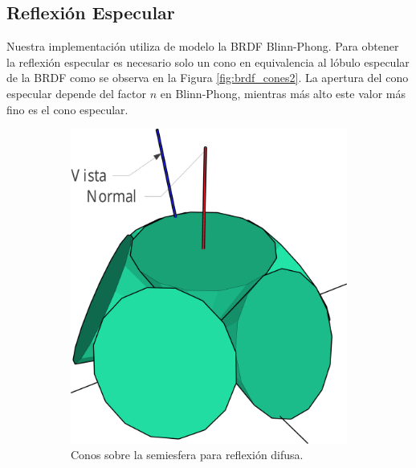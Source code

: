 \subsection{Reflexión Especular}
Nuestra implementación utiliza de modelo la \ac{BRDF} Blinn-Phong. Para obtener la reflexión especular es necesario solo un cono en equivalencia al lóbulo especular de la \ac{BRDF} como se observa en la Figura \ref{fig:brdf_cones2}. La apertura del cono especular depende del factor $n$ en Blinn-Phong, mientras más alto este valor más fino es el cono especular.
\begin{figure}[H]
	\centering
	\begin{subfigure}[t]{.32\linewidth}
		\centering
		\captionsetup{justification=centering}
		\includegraphics[width=\linewidth]{media/diffuse_cones_cropped.pdf}
		\caption*{Conos sobre la semiesfera para reflexión difusa.}
	\end{subfigure}%
	\hspace{0.01\textwidth}
	\begin{subfigure}[t]{.32\linewidth}
		\centering
		\captionsetup{justification=centering}

\end{subfigure}
\end{figure}
